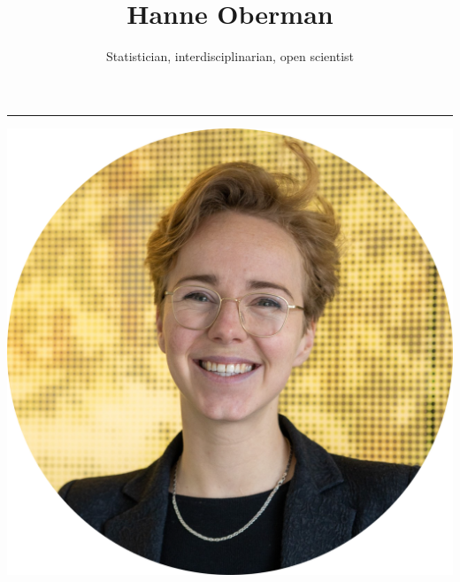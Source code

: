 \documentclass[
  letterpaper,
  DIV=11,
  numbers=noendperiod,
  oneside]{scrartcl}
\title{Hanne Oberman}
\subtitle{Statistician, interdisciplinarian, open scientist}
\author{}
\date{}
\begin{document}
\maketitle
\begin{center}
\href{mailto:h.i.oberman@uu.nl}{}
\href{http://hanneoberman.github.io}{}
\href{https://orcid.org/0000-0003-3276-2141}{}
\href{http://github.com/hanneoberman}{}
\href{https://www.linkedin.com/in/hanneoberman}{}
\href{https://mastodon.social/@oberman}{}
\href{https://twitter.com/hioberman}{}
\end{center}

\ifdefined\Shaded\renewenvironment{Shaded}{\begin{tcolorbox}[breakable, boxrule=0pt, interior hidden, enhanced, borderline west={3pt}{0pt}{shadecolor}, sharp corners, frame hidden]}{\end{tcolorbox}}\fi

\begin{center}\rule{0.5\linewidth}{0.5pt}\end{center}

\includegraphics{avatar.png}
\end{document}
